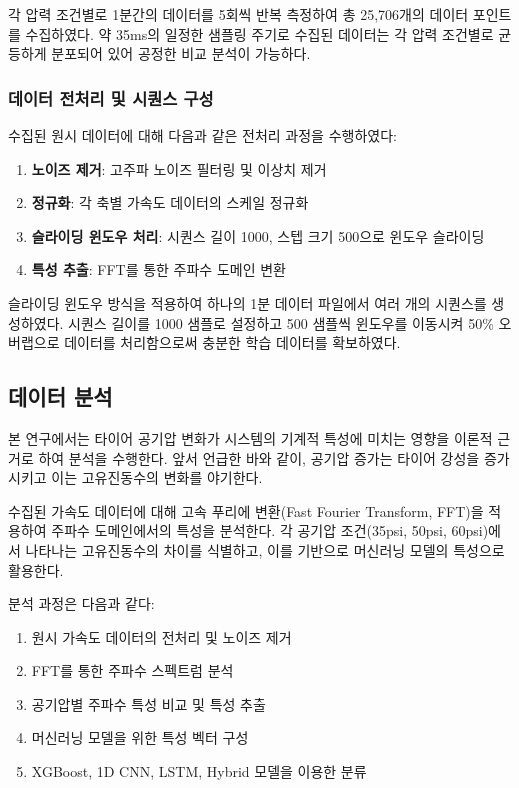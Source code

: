 \documentclass[12pt,a4paper]{article}
\begin{document}
각 압력 조건별로 1분간의 데이터를 5회씩 반복 측정하여 총 25,706개의 데이터 포인트를 수집하였다. 약 35ms의 일정한 샘플링 주기로 수집된 데이터는 각 압력 조건별로 균등하게 분포되어 있어 공정한 비교 분석이 가능하다.

\subsubsection{데이터 전처리 및 시퀀스 구성}
\label{subsubsec:data_preprocessing}

수집된 원시 데이터에 대해 다음과 같은 전처리 과정을 수행하였다:

\begin{enumerate}
    \item \textbf{노이즈 제거}: 고주파 노이즈 필터링 및 이상치 제거
    \item \textbf{정규화}: 각 축별 가속도 데이터의 스케일 정규화
    \item \textbf{슬라이딩 윈도우 처리}: 시퀀스 길이 1000, 스텝 크기 500으로 윈도우 슬라이딩
    \item \textbf{특성 추출}: FFT를 통한 주파수 도메인 변환
\end{enumerate}

슬라이딩 윈도우 방식을 적용하여 하나의 1분 데이터 파일에서 여러 개의 시퀀스를 생성하였다. 시퀀스 길이를 1000 샘플로 설정하고 500 샘플씩 윈도우를 이동시켜 50\% 오버랩으로 데이터를 처리함으로써 충분한 학습 데이터를 확보하였다.

\subsection{데이터 분석}
\label{subsec:data_analysis}

본 연구에서는 타이어 공기압 변화가 시스템의 기계적 특성에 미치는 영향을 이론적 근거로 하여 분석을 수행한다. 앞서 언급한 바와 같이, 공기압 증가는 타이어 강성을 증가시키고 이는 고유진동수의 변화를 야기한다. 

수집된 가속도 데이터에 대해 고속 푸리에 변환(Fast Fourier Transform, FFT)을 적용하여 주파수 도메인에서의 특성을 분석한다. 각 공기압 조건(35psi, 50psi, 60psi)에서 나타나는 고유진동수의 차이를 식별하고, 이를 기반으로 머신러닝 모델의 특성으로 활용한다.

분석 과정은 다음과 같다:
\begin{enumerate}
    \item 원시 가속도 데이터의 전처리 및 노이즈 제거
    \item FFT를 통한 주파수 스펙트럼 분석
    \item 공기압별 주파수 특성 비교 및 특성 추출
    \item 머신러닝 모델을 위한 특성 벡터 구성
    \item XGBoost, 1D CNN, LSTM, Hybrid 모델을 이용한 분류
\end{enumerate}
\end{document}
